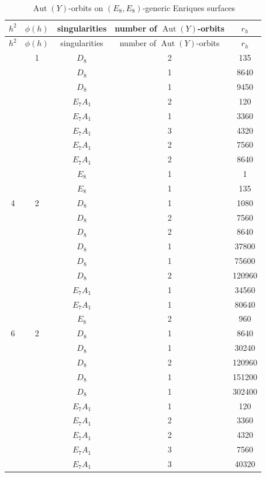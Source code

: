 \documentclass{amsart}
\theoremstyle{definition}
\theoremstyle{plain}
\DeclareMathOperator{\Aut}{Aut}
\begin{document}
\renewcommand{\arraystretch}{1.3}
 \begin{longtable}{ccccc}
 \caption{$\Aut(Y)$-orbits on $(E_8,E_8)$-generic Enriques surfaces}\\
\toprule
$h^2$ &$\phi(h)$&  singularities & number of $\Aut(Y)$-orbits & $r_h$\\
\hline
  \endfirsthead
 \toprule
$h^2$ &$\phi(h)$&  singularities & number of $\Aut(Y)$-orbits & $r_h$ \\
\hline
\endhead
 \endfoot
 \endlastfoot
2 &1 & \(D_{8} \) &2 & 135 \\
 & & \(D_{8} \) &1 & 8640 \\
 & & \(D_{8} \) &1 & 9450 \\
 & & \(E_{7} A_{1} \) &2 & 120 \\
 & & \(E_{7} A_{1} \) &1 & 3360 \\
 & & \(E_{7} A_{1} \) &3 & 4320 \\
 & & \(E_{7} A_{1} \) &2 & 7560 \\
 & & \(E_{7} A_{1} \) &2 & 8640 \\
 & & \(E_{8} \) &1 & 1 \\
 & & \(E_{8} \) &1 & 135 \\
4 & 2& \(D_{8} \) &1 & 1080 \\
 & & \(D_{8} \) &2 & 7560 \\
 & & \(D_{8} \) &2 & 8640 \\
 & & \(D_{8} \) &1 & 37800 \\
 & & \(D_{8} \) &1 & 75600 \\
 & & \(D_{8} \) &2 & 120960 \\
 & & \(E_{7} A_{1} \) &1 & 34560 \\
 & & \(E_{7} A_{1} \) &1 & 80640 \\
 & & \(E_{8} \) &2 & 960 \\
6 &2 & \(D_{8} \) &1 & 8640 \\
 & & \(D_{8} \) &1 & 30240 \\
 & & \(D_{8} \) &2 & 120960 \\
 & & \(D_{8} \) &1 & 151200 \\
 & & \(D_{8} \) &1 & 302400 \\
 & & \(E_{7} A_{1} \) &1 & 120 \\
 & & \(E_{7} A_{1} \) &2 & 3360 \\
 & & \(E_{7} A_{1} \) &2 & 4320 \\
 & & \(E_{7} A_{1} \) &3 & 7560 \\
 & & \(E_{7} A_{1} \) &3 & 40320 \\

\end{longtable}
\end{document}
